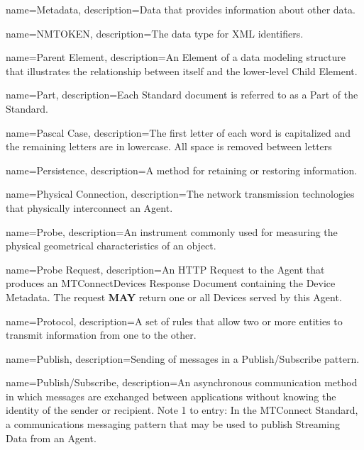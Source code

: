 {
    name={Metadata},
	description={Data that provides information about other data.
}
}

{
    name={NMTOKEN},
	description={The data type for XML identifiers.}
}

{
    name={Parent Element},
	description={An \gls{Element} of a data modeling structure that illustrates the relationship between itself and the lower-level \gls{Child Element}.}
}

{
    name={Part},
	description={Each Standard document is referred to as a \gls{Part} of the Standard.}
}

{
    name={Pascal Case},
	description={The first letter of each word is capitalized and the remaining letters are in lowercase. All space is removed between letters}
}

{
    name={Persistence},
	description={A method for retaining or restoring information.}
}

{
    name={Physical Connection},
	description={The network transmission technologies that physically interconnect an \gls{Agent}.}
}

{
    name={Probe},
	description={An instrument commonly used for measuring the physical geometrical characteristics of an object.}
}

{
    name={Probe Request},
	description={An \gls{HTTP Request} to the \gls{Agent} that produces an \gls{MTConnectDevices Response Document} containing the \gls{Device} \gls{Metadata}. The request \textbf{MAY} return one or all \glspl{Device} served by this \gls{Agent}.}
}

{
    name={Protocol},
	description={A set of rules that allow two or more entities to transmit information from one to the other.}
}

{
    name={Publish},
	description={Sending of messages in a \gls{Publish/Subscribe} pattern.}
}

{
    name={Publish/Subscribe},
	description={An asynchronous communication method in which messages are exchanged between applications without knowing the identity of the sender or recipient.
Note 1 to entry: In the MTConnect Standard, a communications messaging pattern that may be used to publish \gls{Streaming Data} from an \gls{Agent}. }
}

